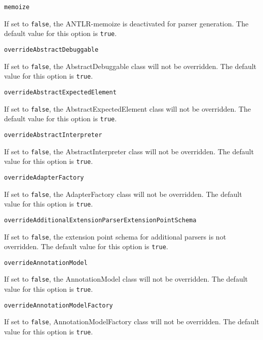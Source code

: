 \noindent\texttt{memoize}
\begin{myindentpar}{1cm}
If set to \texttt{false}, the ANTLR-memoize is deactivated for parser generation. The default value for this option is \texttt{true}.
\end{myindentpar}

\noindent\texttt{overrideAbstractDebuggable}
\begin{myindentpar}{1cm}
If set to \texttt{false}, the AbstractDebuggable class will not be overridden. The default value for this option is \texttt{true}.
\end{myindentpar}

\noindent\texttt{overrideAbstractExpectedElement}
\begin{myindentpar}{1cm}
If set to \texttt{false}, the AbstractExpectedElement class will not be overridden. The default value for this option is \texttt{true}.
\end{myindentpar}

\noindent\texttt{overrideAbstractInterpreter}
\begin{myindentpar}{1cm}
If set to \texttt{false}, the AbstractInterpreter class will not be overridden. The default value for this option is \texttt{true}.
\end{myindentpar}

\noindent\texttt{overrideAdapterFactory}
\begin{myindentpar}{1cm}
If set to \texttt{false}, the AdapterFactory class will not be overridden. The default value for this option is \texttt{true}.
\end{myindentpar}

\noindent\texttt{overrideAdditionalExtensionParserExtensionPointSchema}
\begin{myindentpar}{1cm}
If set to \texttt{false}, the extension point schema for additional parsers is not overridden. The default value for this option is \texttt{true}.
\end{myindentpar}

\noindent\texttt{overrideAnnotationModel}
\begin{myindentpar}{1cm}
If set to \texttt{false}, the AnnotationModel class will not be overridden. The default value for this option is \texttt{true}.
\end{myindentpar}

\noindent\texttt{overrideAnnotationModelFactory}
\begin{myindentpar}{1cm}
If set to \texttt{false}, AnnotationModelFactory class will not be overridden. The default value for this option is \texttt{true}.
\end{myindentpar}


